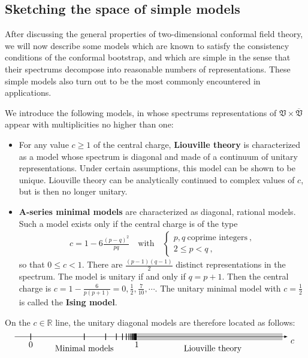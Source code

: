 \documentclass[12pt, a4paper, notitlepage, twoside]{report}
\numberwithin{equation}{section}
\theoremstyle{break}
\begin{document}
\subsection{Sketching the space of simple models \label{secmomo}}

After discussing the general properties of two-dimensional conformal field theory, we will now describe some models which are known to satisfy the consistency conditions of the conformal bootstrap, and which are simple in the sense that their spectrums decompose into reasonable numbers of representations.
These simple models also turn out to be the most commonly encountered in applications.  

We introduce the following models, in whose spectrums representations of $\mathfrak{V}\times \overline{\mathfrak{V}}$ appear with multiplicities no higher than one:
\begin{itemize}
 \item For any value $c\geq 1$ of the central charge, \textbf{\boldmath Liouville theory} is characterized as a model whose spectrum is diagonal and made of a continuum of unitary representations.
Under certain assumptions, this model can be shown to be unique.
Liouville theory can be analytically continued to complex values of $c$, but is then no longer unitary.
\item \textbf{\boldmath A-series minimal models} are characterized as diagonal, rational models.
Such a model exists only if the central charge is of the type 
\begin{align}
 c = 1 - 6 \frac{(p-q)^2}{pq}  \quad \text{with} \quad \left\{\begin{array}{l}  p,q \ \text{coprime  integers}\ , \\ 2\leq p<q\ , \end{array}\right.  
\label{cpq}
\end{align}
so that $0\leq c <1$.
There are $\frac{(p-1)(q-1)}{2}$ distinct representations in the spectrum.
The model is unitary if and only if $q=p+1$.
Then the central charge is $c=1-\frac{6}{p(p+1)}=0,\frac12,\frac{7}{10},\cdots$.
The unitary minimal model with $c=\frac12$ is called the \textbf{\boldmath Ising model}.
\end{itemize}
On the $c\in{\mathbb{R}}$ line, the unitary diagonal models are therefore located as follows:
\begin{align}
 \begin{tikzpicture}[scale = 4.5, baseline=(current  bounding  box.center)]
 \draw[-latex] (-.15, 0) -- (2.4, 0) node [below right] {$c$};
 \node[below] at (.5, -.05) {Minimal models};
 \node[below] at (1.7, -.05) {Liouville theory};
 \foreach \p in {2,...,20}
  {
  \draw [thick] ({1-6/(\p*(\p+1))}, -.03) -- ({1-6/(\p*(\p+1))}, .03);
  }
  \filldraw [opacity = .2] (.98, -.03) -- (.98, .03) -- (2.35, .03) -- (2.35, -.03) -- cycle;
  \node [below] at (0, -.02) {$0$};  \node [below] at (.99, -.02) {$1$};
\end{tikzpicture}
\end{align}
\end{document}
